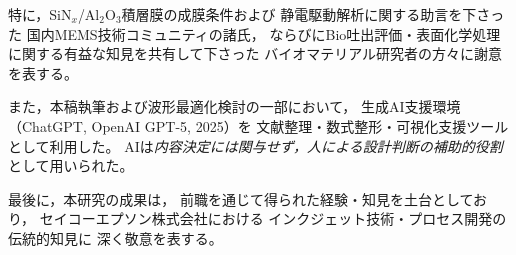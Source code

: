 \documentclass[conference]{IEEEtran}
\begin{document}
特に，SiN$_x$/Al$_2$O$_3$積層膜の成膜条件および
静電駆動解析に関する助言を下さった
国内MEMS技術コミュニティの諸氏，
ならびにBio吐出評価・表面化学処理に関する有益な知見を共有して下さった
バイオマテリアル研究者の方々に謝意を表する。

また，本稿執筆および波形最適化検討の一部において，
生成AI支援環境（ChatGPT, OpenAI GPT-5, 2025）を
文献整理・数式整形・可視化支援ツールとして利用した。
AIは\emph{内容決定には関与せず，人による設計判断の補助的役割}として用いられた。

\vspace{2pt}
\noindent
最後に，本研究の成果は，
前職を通じて得られた経験・知見を土台としており，
セイコーエプソン株式会社における
インクジェット技術・プロセス開発の伝統的知見に
深く敬意を表する。


\end{document}
